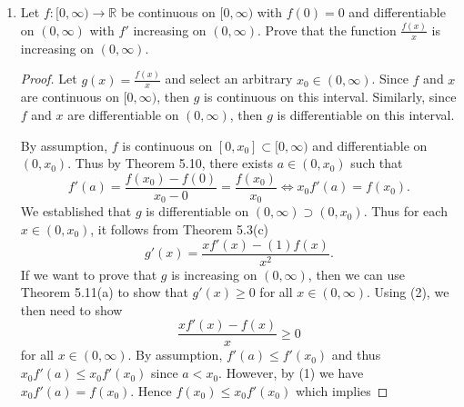 \documentclass[12pt]{article}
\begin{document}
\begin{enumerate}
\begin{proof}
                $x_0\in(x_1, x_2)$ such that $g'(x_0)=0$ which implies
                $f'(x_0)=1$, a contradiction unless $x_1=x_2$. [I'm sorry this
                was so long! I got carried away and had too much fun with it.]  
            \end{proof}
        \item Let $f:[0, \infty)\to\mathbb{R}$ be continuous on $[0, \infty)$
            with $f(0)=0$ and differentiable on $(0, \infty)$ with $f'$
            increasing on $(0, \infty)$. Prove that the function
            $\frac{f(x)}{x}$ is increasing on $(0, \infty)$.
            \begin{proof}
                Let $g(x)=\frac{f(x)}{x}$ and select an arbitrary $x_0\in (0,
                \infty)$. Since $f$ and $x$ are continuous on $[0, \infty)$,
                then $g$ is continuous on this interval. Similarly, since $f$
                and $x$ are differentiable on $(0, \infty)$, then $g$ is
                differentiable on this interval.\par\hspace{4mm}
                By assumption, $f$ is continuous on $[0,
                x_0]\subset[0, \infty)$ and differentiable on $(0, x_0)$. Thus
                by Theorem 5.10, there exists $a\in(0, x_0)$ such that 
                \begin{equation}
                    f'(a)=\frac{f(x_0)-f(0)}{x_0-0}=\frac{f(x_0)}{x_0}\Leftrightarrow
                    x_0f'(a)=f(x_0).
                \end{equation}
                We established that $g$ is differentiable on $(0,
                \infty)\supset(0, x_0)$. Thus for each $x\in (0, x_0)$, it
                follows from Theorem 5.3(c)
                \begin{equation}
                    g'(x)=\frac{xf'(x)-(1)f(x)}{x^2}.
                \end{equation}
                If we want to prove that $g$ is increasing on $(0, \infty)$,
                then we can use Theorem 5.11(a) to show that $g'(x)\geq 0$ for
                all $x\in(0, \infty)$. Using (2), we then need to show
                \begin{equation*}
                    \frac{xf'(x)-f(x)}{x}\geq 0
                \end{equation*}
                for all $x\in(0, \infty)$. By assumption, $f'(a)\leq f'(x_0)$ and
                thus $x_0f'(a)\leq x_0f'(x_0)$ since $a<x_0$. However, by (1) we have 
                $x_0f'(a)=f(x_0)$. Hence $f(x_0)\leq x_0f'(x_0)$ which implies

\end{proof}
\end{enumerate}
\end{document}
